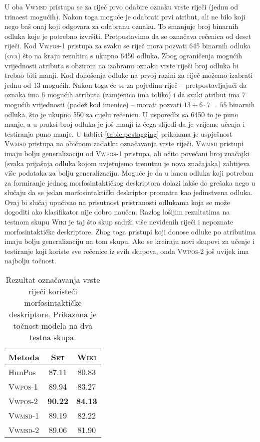 U oba \textsc{Vwmsd} pristupa se za riječ prvo odabire oznaku vrste riječi
(jednu od trinaest mogućih). Nakon toga moguće je odabrati prvi atribut, ali ne
bilo koji nego baš onaj koji odgovara za odabranu oznaku. To smanjuje broj
binarnih odluka koje je potrebno izvršiti. Pretpostavimo da se označava rečenica
od deset riječi. Kod \textsc{Vwpos-1} pristupa za svaku se riječ mora pozvati
645 binarnih odluka (\textsc{ova}) što na kraju rezultira s ukupno 6450 odluka.
Zbog ograničenja mogućih vrijednosti atributa s obzirom na izabranu oznaku vrste
riječi broj odluka bi trebao biti manji. Kod donošenja odluke na prvoj razini za
riječ možemo izabrati jednu od 13 mogućih. Nakon toga će se za pojedinu riječ --
pretpostavljajući da oznaka ima 6 mogućih atributa (zamjenica ima toliko) i da
svaki atribut ima 7 mogućih vrijednosti (padež kod imenice) -- morati pozvati
$13+6 \cdot 7 = 55$ binarnih odluka, što je ukupno 550 za cijelu rečenicu. U
usporedbi sa 6450 to je puno manje, a u praksi broj odluka je još manji iz čega
slijedi da je vrijeme učenja i testiranja puno manje. U tablici
\ref{table:postagging} prikazana je uspješnost \textsc{Vwmsd} pristupa na
običnom zadatku označavanja vrste riječi. \textsc{Vwmsd} pristupi imaju bolju
generalizaciju od \textsc{Vwpos-1} pristupa, ali očito povećani broj značajki
(svaka prijašnja odluka kojom uvjetujemo trenutnu je nova značajaka) zahtijeva
više podataka za bolju generalizaciju. Moguće je da u lancu odluka koji potreban
za formiranje jednog morfosintaktičkog deskriptora dolazi lakše do grešaka nego
u slučaju da se jedan morfosintaktički deskriptor promatra kao jedinstvena
odluka. Ovaj bi slučaj upućivao na prisutnost pristranosti odlukama koja se može
dogoditi ako klasifikator nije dobro naučen. Razlog lošijim rezultatima na
testnom skupu \textsc{Wiki} je taj što skup sadrži više neviđenih riječi i
nepoznate morfosintaktičke deskriptore. Zbog toga pristupi koji donose odluke po
atributima imaju bolju generalizaciju na tom skupu. Ako se kreiraju novi skupovi
za učenje i testiranje koji koriste sve rečenice iz svih skupova, onda
\textsc{Vwpos-2} još uvijek ima najbolju točnost.

\begin{table}
\centering
\caption[Rezultat označavanja vrste riječi koristeći morfosintaktičke
deskriptore.]{Rezultat označavanja vrste riječi koristeći morfosintaktičke
deskriptore. Prikazana je točnost modela na dva testna skupa.}
\label{table:msdtagging}
\begin{tabular}{|l|c|c|}
\hline
Metoda             & \textsc{Set}   & \textsc{Wiki}  \\ \hline \hline
HunPos             & 87.11          & 80.83          \\
\textsc{Vwpos-1}   & 89.94          & 83.27          \\
\textsc{Vwpos-2}   & \textbf{90.22} & \textbf{84.13} \\
\textsc{Vwmsd-1}   & 89.19          & 82.22          \\
\textsc{Vwmsd-2}   & 89.06          & 81.90          \\ \hline
\end{tabular}
\end{table}
